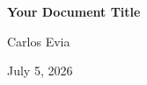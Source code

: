 \begin{titlepage}
    \centering
    \vspace*{2in}
    {\Huge \bfseries Your Document Title\par}
    \vspace{1in}
    {\Large Carlos Evia\par}
    \vfill
    {\large July 5, 2026\par}
\end{titlepage}